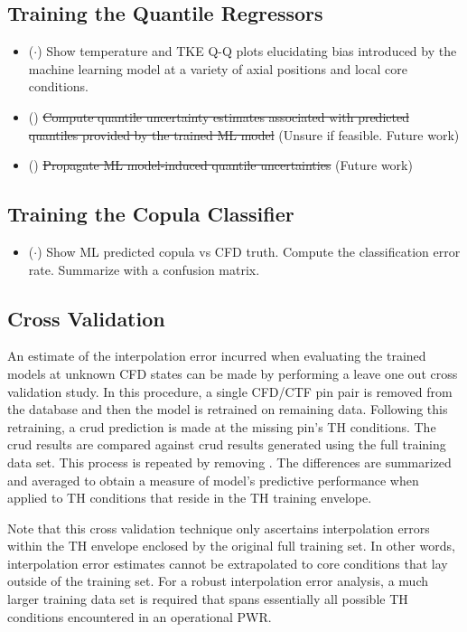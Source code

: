 \subsection{Training the Quantile Regressors}

\begin{itemize}
    \item ($\cdot$) Show temperature and TKE Q-Q plots elucidating bias introduced by the machine learning model at a variety of axial positions and local core conditions.
    \item (\xmark) \sout{Compute quantile uncertainty estimates associated with predicted quantiles provided by the trained ML model} (Unsure if feasible. Future work)
    \item (\xmark) \sout{Propagate ML model-induced quantile uncertainties} (Future work)
\end{itemize}

\subsection{Training the Copula Classifier}

\begin{itemize}
    \item ($\cdot$)  Show ML predicted copula vs CFD truth.  Compute the classification error rate.
        Summarize with a confusion matrix.
\end{itemize}


\subsection{Cross Validation}

An estimate of the interpolation error incurred when evaluating the trained models at unknown CFD states can be made by performing a leave one out cross validation study.
In this procedure, a single CFD/CTF pin pair is removed from the database and then the model is retrained on remaining data.  Following this retraining, a crud prediction is made 
at the missing pin's TH conditions.  The crud results are compared against crud results generated using the full training data set.  This process is repeated by
removing .  The differences are summarized and averaged to obtain a measure of model's predictive performance when applied to TH conditions that reside in the TH training envelope.

Note that this cross validation technique only ascertains interpolation errors within the TH envelope enclosed by the original full training set.  In other words, interpolation error
estimates cannot be extrapolated to core conditions that lay outside of the training set.  For a robust interpolation error analysis, a much larger training data set is required
that spans essentially all possible TH conditions encountered in an operational PWR.

